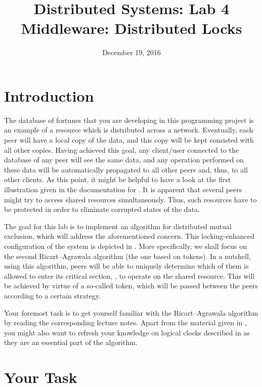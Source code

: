 \documentclass[a4paper]{article}
\title{Distributed Systems: Lab 4\\Middleware: Distributed Locks}
\author{}
\date{December 19, 2016}
\begin{document}
\maketitle

\section{Introduction}

The database of fortunes that you are developing in this programming project is
an example of a resource which is distributed across a network. Eventually, each
peer will have a local copy of the data, and this copy will be kept consisted
with all other copies. Having achieved this goal, any client/user connected to
the database of any peer will see the same data, and any operation performed on
these data will be automatically propagated to all other peers and, thus, to all
other clients. As this point, it might be helpful to have a look at the first
illustration given in the documentation for . It is apparent that
several peers might try to access shared resources simultaneously. Thus, such
resources have to be protected in order to eliminate corrupted states of the
data.

The goal for this lab is to implement an algorithm for distributed mutual
exclusion, which will address the aforementioned concern. This locking-enhanced
configuration of the system is depicted in . More specifically, we
shall focus on the second Ricart--Agrawala algorithm \cite{lecture67} (the one
based on tokens). In a nutshell, using this algorithm, peers will be able to
uniquely determine which of them is allowed to enter its critical section, \ie,
to operate on the shared resource. This will be achieved by virtue of a
so-called token, which will be passed between the peers according to a certain
strategy.

Your foremost task is to get yourself familiar with the Ricart--Agrawala
algorithm by reading the corresponding lecture notes. Apart from the material
given in \cite{lecture67}, you might also want to refresh your knowledge on
logical clocks described in \cite{lecture5} as they are an essential part of the
algorithm.

\section{Your Task}
\end{document}
